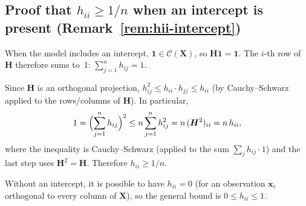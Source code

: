 \documentclass[11pt,a4paper]{article}
\theoremstyle{plain}
\theoremstyle{definition}
\newcommand{\bX}{\bm{X}}
\newcommand{\bH}{\bm{H}}
\newcommand{\Col}{\mathcal{C}}
\begin{document}
\subsection{Proof that $h_{ii} \ge 1/n$ when an intercept is present (Remark~\ref{rem:hii-intercept})}

When the model includes an intercept, $\bm{1}\in\Col(\bX)$, so
$\bH\bm{1} = \bm{1}$. The $i$-th row of $\bH$ therefore sums to~1:
$\sum_{j=1}^n h_{ij} = 1$.

Since $\bH$ is an orthogonal projection, $h_{ij}^2 \le h_{ii}\cdot h_{jj} \le h_{ii}$
(by Cauchy--Schwarz applied to the rows/columns of $\bH$).  In particular,
\[
  1 = \Bigl(\sum_{j=1}^n h_{ij}\Bigr)^2
  \le n\sum_{j=1}^n h_{ij}^2
  = n\,(\bH^2)_{ii}
  = n\,h_{ii},
\]
where the inequality is Cauchy--Schwarz (applied to the sum $\sum_j h_{ij}\cdot 1$)
and the last step uses $\bH^2 = \bH$.
Therefore $h_{ii}\ge 1/n$.

Without an intercept, it is possible to have $h_{ii} = 0$ (for an observation
$\bm{x}_i$ orthogonal to every column of $\bX$), so the general bound is
$0 \le h_{ii} \le 1$.
\end{document}
